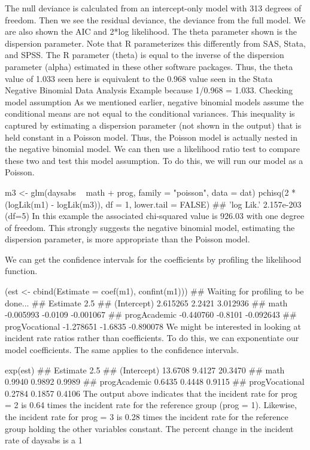 \documentclass[00-GLMregression.tex]{subfiles}
\begin{document}
The null deviance is calculated from an intercept-only model with 313 degrees of freedom. Then we see the residual deviance, the deviance from the full model. We are also shown the AIC and 2*log likelihood.
The theta parameter shown is the dispersion parameter. Note that R parameterizes this differently from SAS, Stata, and SPSS. The R parameter (theta) is equal to the inverse of the dispersion parameter (alpha) estimated in these other software packages. Thus, the theta value of 1.033 seen here is equivalent to the 0.968 value seen in the Stata Negative Binomial Data Analysis Example because 1/0.968 = 1.033.
Checking model assumption
As we mentioned earlier, negative binomial models assume the conditional means are not equal to the conditional variances. This inequality is captured by estimating a dispersion parameter (not shown in the output) that is held constant in a Poisson model. Thus, the Poisson model is actually nested in the negative binomial model. We can then use a likelihood ratio test to compare these two and test this model assumption. To do this, we will run our model as a Poisson.

m3 <- glm(daysabs ~ math + prog, family = "poisson", data = dat)
pchisq(2 * (logLik(m1) - logLik(m3)), df = 1, lower.tail = FALSE)
## 'log Lik.' 2.157e-203 (df=5)
In this example the associated chi-squared value is 926.03 with one degree of freedom. This strongly suggests the negative binomial model, estimating the dispersion parameter, is more appropriate than the Poisson model.

We can get the confidence intervals for the coefficients by profiling the likelihood function.

(est <- cbind(Estimate = coef(m1), confint(m1)))
## Waiting for profiling to be done...
##                 Estimate   2.5 %
## (Intercept)     2.615265  2.2421  3.012936
## math           -0.005993 -0.0109 -0.001067
## progAcademic   -0.440760 -0.8101 -0.092643
## progVocational -1.278651 -1.6835 -0.890078
We might be interested in looking at incident rate ratios rather than coefficients. To do this, we can exponentiate our model coefficients. The same applies to the confidence intervals.

exp(est)
##                Estimate  2.5 %
## (Intercept)     13.6708 9.4127 20.3470
## math             0.9940 0.9892  0.9989
## progAcademic     0.6435 0.4448  0.9115
## progVocational   0.2784 0.1857  0.4106
The output above indicates that the incident rate for prog = 2 is 0.64 times the incident rate for the reference group (prog = 1). Likewise, the incident rate for prog = 3 is 0.28 times the incident rate for the reference group holding the other variables constant. The percent change in the incident rate of daysabs is a 1%
\end{document}
